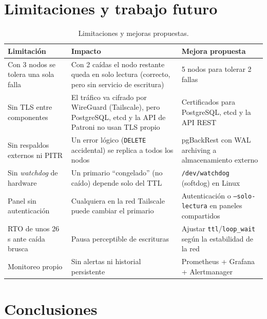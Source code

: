 \documentclass[11pt,a4paper]{article}
\newcommand{\cod}[1]{\texttt{#1}}
\begin{document}
\section{Limitaciones y trabajo futuro}

\begin{table}[H]
\centering
\small
\caption{Limitaciones y mejoras propuestas.}
\begin{tabularx}{\textwidth}{@{}L{3.8cm}YL{4.2cm}@{}}
\toprule
\textbf{Limitación} & \textbf{Impacto} & \textbf{Mejora propuesta} \\
\midrule
Con 3 nodos se tolera una sola falla & Con 2 caídas el nodo restante queda en solo lectura (correcto, pero sin servicio de escritura) & 5 nodos para tolerar 2 fallas \\
Sin TLS entre componentes & El tráfico va cifrado por WireGuard (Tailscale), pero PostgreSQL, etcd y la API de Patroni no usan TLS propio & Certificados para PostgreSQL, etcd y la API REST \\
Sin respaldos externos ni PITR & Un error lógico (\cod{DELETE} accidental) se replica a todos los nodos & pgBackRest con WAL archiving a almacenamiento externo \\
Sin \emph{watchdog} de hardware & Un primario ``congelado'' (no caído) depende solo del TTL & \cod{/dev/watchdog} (softdog) en Linux \\
Panel sin autenticación & Cualquiera en la red Tailscale puede cambiar el primario & Autenticación o \cod{--solo-lectura} en paneles compartidos \\
RTO de unos 26 s ante caída brusca & Pausa perceptible de escrituras & Ajustar \cod{ttl}/\cod{loop\_wait} según la estabilidad de la red \\
Monitoreo propio & Sin alertas ni historial persistente & Prometheus + Grafana + Alertmanager \\
\bottomrule
\end{tabularx}
\end{table}

\section{Conclusiones}
\end{document}
